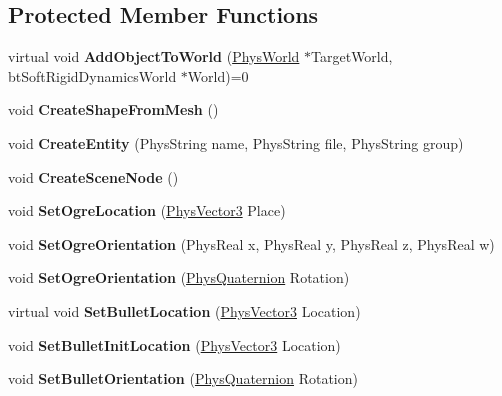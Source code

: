 \subsection*{Protected Member Functions}
\begin{DoxyCompactItemize}
\item 
\hypertarget{classActorBase_a1af82a2ed960fd114518fdf84d5ff146}{
virtual void {\bfseries AddObjectToWorld} (\hyperlink{classPhysWorld}{PhysWorld} $\ast$TargetWorld, btSoftRigidDynamicsWorld $\ast$World)=0}
\label{dd/d7b/classActorBase_a1af82a2ed960fd114518fdf84d5ff146}

\item 
\hypertarget{classActorBase_ab9b40cbd820b3b16237f8036994d49c3}{
void {\bfseries CreateShapeFromMesh} ()}
\label{dd/d7b/classActorBase_ab9b40cbd820b3b16237f8036994d49c3}

\item 
\hypertarget{classActorBase_aa87583c47b8653e8ac7d96f1481b57fd}{
void {\bfseries CreateEntity} (PhysString name, PhysString file, PhysString group)}
\label{dd/d7b/classActorBase_aa87583c47b8653e8ac7d96f1481b57fd}

\item 
\hypertarget{classActorBase_a168cd57e20b2adfc5cae21627ddbae31}{
void {\bfseries CreateSceneNode} ()}
\label{dd/d7b/classActorBase_a168cd57e20b2adfc5cae21627ddbae31}

\item 
\hypertarget{classActorBase_a3140cc5c1c630efc1c04c20ada319b8b}{
void {\bfseries SetOgreLocation} (\hyperlink{classPhysVector3}{PhysVector3} Place)}
\label{dd/d7b/classActorBase_a3140cc5c1c630efc1c04c20ada319b8b}

\item 
\hypertarget{classActorBase_a64ec1d0987bb32070e0c686db3b06e56}{
void {\bfseries SetOgreOrientation} (PhysReal x, PhysReal y, PhysReal z, PhysReal w)}
\label{dd/d7b/classActorBase_a64ec1d0987bb32070e0c686db3b06e56}

\item 
\hypertarget{classActorBase_a55f45703e3d9b8de0cd07b23bd9460bf}{
void {\bfseries SetOgreOrientation} (\hyperlink{classPhysQuaternion}{PhysQuaternion} Rotation)}
\label{dd/d7b/classActorBase_a55f45703e3d9b8de0cd07b23bd9460bf}

\item 
\hypertarget{classActorBase_af64a57138bbd32c52581a5c8d0d29a76}{
virtual void {\bfseries SetBulletLocation} (\hyperlink{classPhysVector3}{PhysVector3} Location)}
\label{dd/d7b/classActorBase_af64a57138bbd32c52581a5c8d0d29a76}

\item 
\hypertarget{classActorBase_af52177760d530df2b0987ed8626a656d}{
void {\bfseries SetBulletInitLocation} (\hyperlink{classPhysVector3}{PhysVector3} Location)}
\label{dd/d7b/classActorBase_af52177760d530df2b0987ed8626a656d}

\item 
\hypertarget{classActorBase_adf817bd5a7c562f31f6724a06a3a0f79}{
void {\bfseries SetBulletOrientation} (\hyperlink{classPhysQuaternion}{PhysQuaternion} Rotation)}
\label{dd/d7b/classActorBase_adf817bd5a7c562f31f6724a06a3a0f79}

\end{DoxyCompactItemize}
